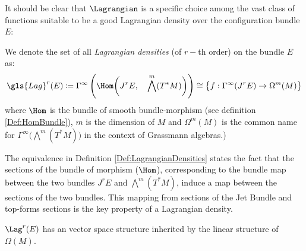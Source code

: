 \documentclass[Main]{subfiles}
\begin{document}
	\vspace{3mm}
	It should be clear that $\Lagrangian$ is a specific choice among the vast class of functions suitable to be a good Lagrangian density over the  configuration bundle $E$:
	\begin{definition}\label{Def:LagrangianDensities}
		We denote the set of all \emph{Lagrangian densities} (of $r-$th order) on the bundle $E$ as:
		\begin{displaymath}
			\gls{Lag}^r (E) \coloneqq \Gamma^\infty \left( \Hom\biggr(J^r E,\quad \bigwedge^m( T^*M)\biggr) \right) \cong \big\{f:\Gamma^\infty(J^r E) \rightarrow \Omega^m(M)  \big\}
		\end{displaymath}
	where $\Hom$ is the bundle of smooth bundle-morphism (see definition \ref{Def:HomBundle}), $m$ is the dimension of $M$ and $\Omega^m(M)$ is the common name for $\Gamma^\infty \big( \bigwedge^m( T^*M) \big)$ in the context of Grassmann algebras.)\\
	\end{definition}
	The equivalence in Definition \ref{Def:LagrangianDensities} states the fact that the sections of the bundle of morphism ($\Hom$),  corresponding to the bundle map between the two bundles $J^r E$ and $\bigwedge^m( T^*M)$,  induce a map between the sections of the two bundles.
	This mapping from sections of the Jet Bundle and top-forms sections is the key property of a Lagrangian density.
	\begin{proposition}
		$\Lag^r(E)$ has an vector space structure inherited by the linear structure of $\Omega(M)$.
	\end{proposition}
	
\end{document}
